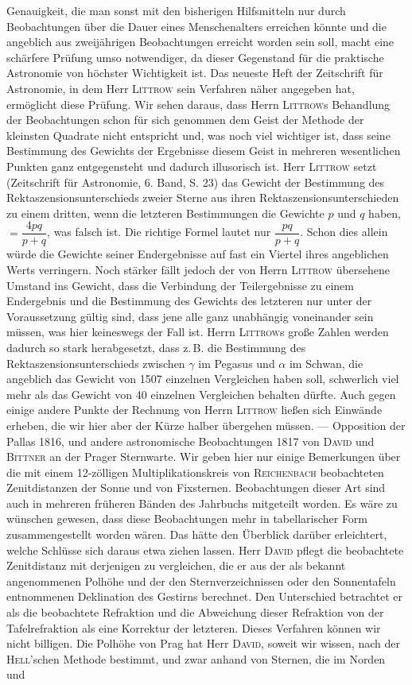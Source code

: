 Genauigkeit, die man sonst mit den bisherigen Hilfsmitteln nur durch Beobachtungen über die Dauer eines Menschenalters erreichen könnte und die angeblich aus zweijährigen Beobachtungen erreicht worden sein soll, macht eine schärfere Prüfung umso notwendiger, da dieser Gegenstand für die praktische Astronomie von höchster Wichtigkeit ist. Das neueste Heft der Zeitschrift für Astronomie, in dem Herr \textsc{Littrow} sein Verfahren näher angegeben hat, ermöglicht diese Prüfung. Wir sehen daraus, dass Herrn \textsc{Littrow}s Behandlung der Beobachtungen schon für sich genommen dem Geist der Methode der kleinsten Quadrate nicht entspricht und, was noch viel wichtiger ist, dass seine Bestimmung des Gewichts der Ergebnisse diesem Geist in mehreren wesentlichen Punkten ganz entgegensteht und dadurch illusorisch ist. Herr \textsc{Littrow} setzt (Zeitschrift für Astronomie, 6. Band, S. 23) das Gewicht der Bestimmung des Rektaszensionsunterschieds zweier Sterne aus ihren Rektaszensionsunterschieden zu einem dritten, wenn die letzteren Bestimmungen die Gewichte $p$ und $q$ haben, $=\dfrac{4pq}{p+q}$, was falsch ist. Die richtige Formel lautet nur $\dfrac{pq}{p+q}$. Schon dies allein würde die Gewichte seiner Endergebnisse auf fast ein Viertel ihres angeblichen Werts verringern. Noch stärker fällt jedoch der von Herrn \textsc{Littrow} übersehene Umstand ins Gewicht, dass die Verbindung der Teilergebnisse zu einem Endergebnis und die Bestimmung des Gewichts des letzteren nur unter der Voraussetzung gültig sind, dass jene alle ganz unabhängig voneinander sein müssen, was hier keineswegs der Fall ist. Herrn \textsc{Littrow}s große Zahlen werden dadurch so stark herabgesetzt, dass z.\,B. die Bestimmung des Rektaszensionsunterschieds zwischen $\gamma$ im Pegasus und $\alpha$ im Schwan, die angeblich das Gewicht von 1507 einzelnen Vergleichen haben soll, schwerlich viel mehr als das Gewicht von 40 einzelnen Vergleichen behalten dürfte. Auch gegen einige andere Punkte der Rechnung von Herrn \textsc{Littrow} ließen sich Einwände erheben, die wir hier aber der Kürze halber übergehen müssen. --- Opposition der Pallas 1816, und andere astronomische Beobachtungen 1817 von \textsc{David} und \textsc{Bittner} an der Prager Sternwarte. Wir geben hier nur einige Bemerkungen über die mit einem 12-zölligen Multiplikationskreis von \textsc{Reichenbach} beobachteten Zenitdistanzen der Sonne und von Fixsternen. Beobachtungen dieser Art sind auch in mehreren früheren Bänden des Jahrbuchs mitgeteilt worden. Es wäre zu wünschen gewesen, dass diese Beobachtungen mehr in tabellarischer Form zusammengestellt worden wären. Das hätte den Überblick darüber erleichtert, welche Schlüsse sich daraus etwa ziehen lassen. Herr \textsc{David} pflegt die beobachtete Zenitdistanz mit derjenigen zu vergleichen, die er aus der als bekannt angenommenen Polhöhe und der den Sternverzeichnissen oder den Sonnentafeln entnommenen Deklination des Gestirns berechnet. Den Unterschied betrachtet er als die beobachtete Refraktion und die Abweichung dieser Refraktion von der Tafelrefraktion als eine Korrektur der letzteren. Dieses Verfahren können wir nicht billigen. Die Polhöhe von Prag hat Herr \textsc{David}, soweit wir wissen, nach der \textsc{Hell}'schen Methode bestimmt, und zwar anhand von Sternen, die im Norden und 